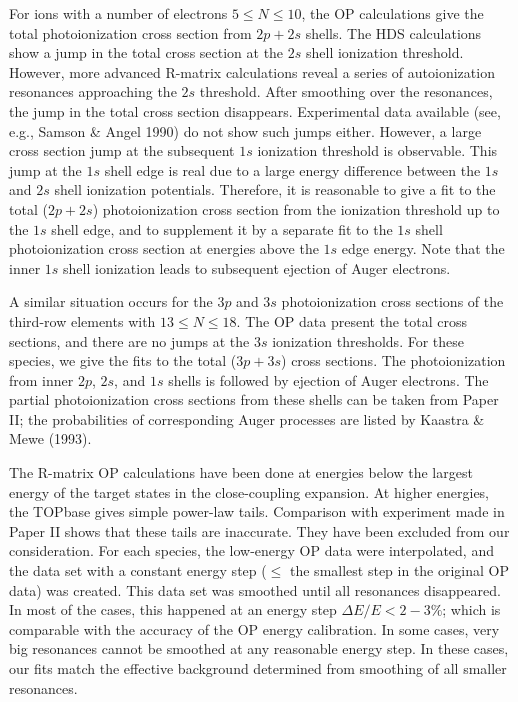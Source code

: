 For ions with 
a number of electrons $5 \le N \le 10$, the OP calculations give the total 
photoionization cross section from $2p+2s$ shells. The HDS calculations show a 
jump in the total cross section at the $2s$ shell ionization threshold.
However, more advanced R-matrix calculations reveal a series of autoionization 
resonances approaching the $2s$ threshold. After smoothing over the resonances,
the jump in the total cross section disappears. Experimental data available 
(see, e.g.,  
Samson \& Angel 1990) do not show such jumps either. However,
a large cross section jump at the subsequent $1s$ ionization threshold is 
observable. This jump at the $1s$ shell edge is real due to a large energy 
difference between the $1s$ and $2s$ shell ionization potentials. Therefore,
it is reasonable to give a fit to the total ($2p+2s$) photoionization cross 
section from the ionization threshold up to the $1s$ shell edge, and to 
supplement it by a separate fit to the $1s$ shell photoionization cross section
at energies above the $1s$ edge energy. Note that the inner $1s$ shell 
ionization leads to subsequent ejection of Auger electrons. 

A similar situation
occurs for the $3p$ and $3s$ photoionization cross sections of the third-row 
elements with $13 \le N \le 18$. The OP data present the total cross sections, 
and there are no jumps at the $3s$ ionization thresholds. For these species, 
we give the fits to the total ($3p+3s$) cross sections. The photoionization 
from inner $2p$, $2s$, and $1s$ shells is followed by ejection of Auger 
electrons. The partial photoionization cross sections from these shells can be 
taken from Paper II; the probabilities of corresponding Auger processes are
listed by  Kaastra \& Mewe (1993).

The R-matrix OP calculations have been done at energies below the largest 
energy of the target states in the close-coupling expansion. At higher 
energies, the TOPbase gives simple power-law tails. Comparison with experiment
made in Paper II shows that these tails are inaccurate. They have been excluded
from our consideration. For each species, the low-energy OP data were 
interpolated, and the data set with a constant energy step ($\leq$ the smallest
step in the original OP data) was created. This data set was smoothed until all
resonances disappeared. In most of the cases, this happened at an energy step
$\Delta E/E < 2-3\%$; which is comparable with the accuracy of the OP energy 
calibration. In some cases, very big resonances cannot be smoothed at any 
reasonable energy step. In these cases, our fits match the effective background
determined from smoothing of all smaller resonances. 

